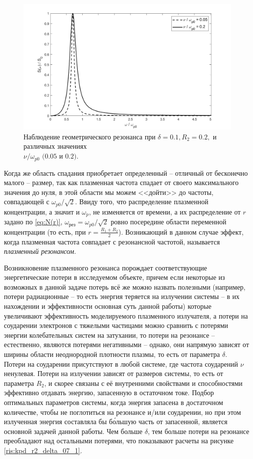 \begin{figure}[H]\centering	
	\includegraphics[scale=0.7]{pics/SPM_minimal}
	\caption{Наблюдение геометрического резонанса при $\delta=0.1, R_{2}=0.2,$  и различных значениях \\ $\nu/\omega_{p0} $ $(0.05$ и $0.2)$.}
	\label{pic:spm_res}
\end{figure}

Когда же область спадания приобретает определенный -- отличный от бесконечно малого -- размер, так как плазменная частота спадает от своего максимального значения до нуля, в этой области мы можем <<дойти>> до частоты, совпадающей с $\omega_{p 0}/\sqrt{2}$. Ввиду того, что распределение плазменной концентрации, а значит и $\omega_{p}$, не изменяется от времени, а их распределение от $r$ задано по \eqref{eq:N(r)}, $\omega_{\text{рез}}=\omega_{p 0}/\sqrt{2}$ ровно посередине области переменной концентрации (то есть, при $r=\frac{R_{1}+R_{2}}{2}$). Возникающий в данном случае эффект, когда плазменная частота совпадает с резонансной частотой, называется \textit{плазменный резонансом}. 

Возникновение плазменного резонанса порождает соответствующие энергетические потери в исследуемом объекте, причем если некоторые из возможных в данной задаче потерь всё же можно назвать полезными (например, потери радиационные -- то есть энергия теряется на излучении системы -- в их нахождении и эффективности основная суть данной работы) которые увеличивают эффективность моделируемого плазменного излучателя, а потери на соударении электронов с тяжелыми частицами можно сравнить с потерями энергии колебательных систем на затухании, то потери на резонансе --  естественно, являются потерями негативными -- однако, они напрямую зависят от ширины области неоднородной плотности плазмы, то есть от параметра $\delta$. Потери на соударении присутствуют в любой системе, где частота соударений $\nu$ ненулевая. Потери на излучении зависят от размеров системы, то есть от параметра $R_{2}$, и скорее связаны с её внутренними свойствами и способностями эффективно отдавать энергию, запасенную в остаточном токе. Подбор оптимальных параметров системы, когда энергия запасена в достаточном количестве, чтобы не поглотиться на резонансе и/или соударении, но при этом излученная энергия составляла бы б\'ольшую часть от запасенной, является основной задачей данной работы. Чем больше $\delta$, тем больше потери на резонансе преобладают над остальными потерями, что показывают расчеты на рисунке \ref{ris:kpd_r2_delta_07_1}.


